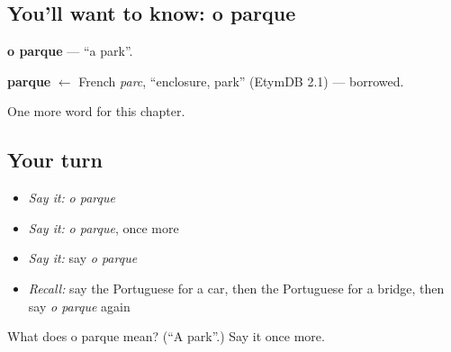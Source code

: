 \subsection*{You'll want to know: o parque}
\textbf{o parque} — \textquotedblleft{}a park\textquotedblright{}.

\begin{cousinweb}
\textbf{parque} $\leftarrow$ French \emph{parc}, \textquotedblleft{}enclosure, park\textquotedblright{} (EtymDB 2.1) — borrowed.
\end{cousinweb}

\begin{grammarlens}[title={What you've built}]
One more word for this chapter.
\end{grammarlens}

\subsection*{Your turn}
\begin{itemize}
\raggedright
  \item \emph{Say it:} \emph{o parque}
  \item \emph{Say it:} \emph{o parque}, once more
  \item \emph{Say it:} say \emph{o parque}
  \item \emph{Recall:} say the Portuguese for a car, then the Portuguese for a bridge, then say \emph{o parque} again
\end{itemize}

\begin{tcolorbox}[breakable,colback=teal!4,colframe=teal!35!black,title={Before you move on}]
What does o parque mean? (\textquotedblleft{}A park\textquotedblright{}.) Say it once more.
\end{tcolorbox}
